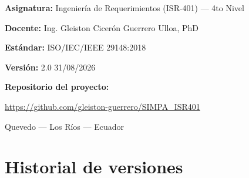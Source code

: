 \documentclass[11pt,a4paper]{article}
\begin{document}
\begin{titlepage}
\vspace{0.9cm}
{\bfseries Asignatura:} Ingeniería de Requerimientos (ISR-401) --- 4to Nivel\par
{\bfseries Docente:} Ing. Gleiston Cicerón Guerrero Ulloa, PhD\par
{\bfseries Estándar:} ISO/IEC/IEEE 29148:2018\par
{\bfseries Versión:} 2.0  31/08/2026

\vspace{0.8cm}
{\bfseries Repositorio del proyecto:}\par
\url{https://github.com/gleiston-guerrero/SIMPA_ISR401}

\vfill
{\small Quevedo --- Los Ríos --- Ecuador\par}
\end{titlepage}

\section*{Historial de versiones}
\end{document}
